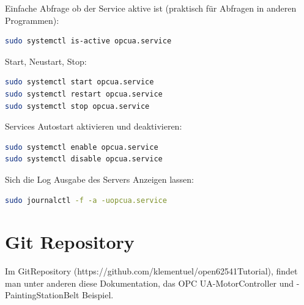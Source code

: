 Einfache Abfrage ob der Service aktive ist (praktisch für Abfragen in anderen Programmen):
\begin{lstlisting}[language=Bash]
sudo systemctl is-active opcua.service
\end{lstlisting}

Start, Neustart, Stop:
\begin{lstlisting}[language=Bash]
sudo systemctl start opcua.service
sudo systemctl restart opcua.service 
sudo systemctl stop opcua.service 
\end{lstlisting}

Services Autostart aktivieren und deaktivieren:
\begin{lstlisting}[language=Bash]
sudo systemctl enable opcua.service 
sudo systemctl disable opcua.service 
\end{lstlisting}

Sich die Log Ausgabe des Servers Anzeigen lassen:
\begin{lstlisting}[language=Bash]
sudo journalctl -f -a -uopcua.service
\end{lstlisting}




\clearpage
\section{Git Repository}
Im GitRepository (https://github.com/klementuel/open62541Tutorial), findet man unter anderen diese Dokumentation, das OPC UA-MotorController und -PaintingStationBelt Beispiel.

